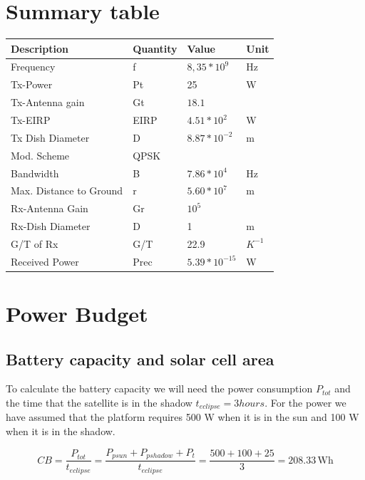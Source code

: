 \documentclass[a4paper,12pt,calibri,oneside,openany]{book}
\newcommand{\unit}[1]{\ensuremath{\, \mathrm{#1}}}
\theoremstyle{break}
\begin{document}
	\section{Summary table}	

		\begin{center}
			\begin{tabular}{ | l | l | l | p{1.5cm} |}
				\hline
				Description & Quantity & Value & Unit \\ \hline
				Frequency & f  & $8,35*10^{9}$ & Hz \\ \hline
				Tx-Power & Pt & 25 & W
				\\ \hline
				Tx-Antenna gain & Gt & $18.1$ & 
				\\ \hline
				Tx-EIRP & EIRP & $4.51*10^{2}$ & W
				\\ \hline
				Tx Dish Diameter & D & $8.87*10^{-2}$ & m
				\\ \hline
				Mod. Scheme & QPSK &  & 
				\\ \hline
				Bandwidth & B & $7.86*10^{4}$ & Hz
				\\ \hline
				Max. Distance to Ground & r & $5.60*10^{7}$ & m
				\\ \hline
				Rx-Antenna Gain & Gr & $10^{5}$ & 
				\\ \hline
				Rx-Dish Diameter & D & 1 & m
				\\ \hline
				G/T of Rx & G/T & 22.9 & $K^{-1}$
				\\ \hline
				Received Power & Prec & $5.39*10^{-15}$ & W
				\\ \hline
				
						\end{tabular}
					\end{center}
				
\newpage
\section{Power Budget}
	\subsection{Battery capacity and solar cell area}
	
		To calculate the battery capacity we will need the power consumption $P_{tot}$ and the time that the satellite is in the shadow $t_{eclipse} = 3 hours$. For the power we have assumed that the platform requires 500 W when it is in the sun and 100 W when it is in the shadow.
		
		\begin{equation} \label{eq_cb}
			CB = \dfrac{P_{tot}}{t_{eclipse}} =
			\dfrac{P_{psun} +  P_{pshadow} + P_{t} }{t_{eclipse}}=
			\dfrac{500 +  100 + 25 } {3} = 208.33 \unit{Wh}
		\end{equation}
		
\end{document}

